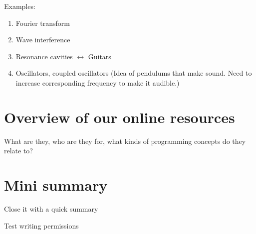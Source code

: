 Examples:
\begin{enumerate}
    \item Fourier transform
    \item Wave interference
    \item Resonance cavities $\leftrightarrow{}$ Guitars
    \item Oscillators, coupled oscillators (Idea of pendulums that make sound. Need to increase corresponding frequency to make it audible.)
\end{enumerate}

\section{Overview of our online resources}
What are they, who are they for, what kinds of programming concepts do they relate to?

\section{Mini summary}
Close it with a quick summary

Test writing permissions
